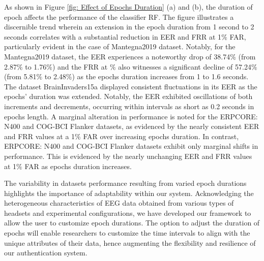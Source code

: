 As shown in Figure \ref{fig: Effect of Epochs Duration} (a) and (b), the duration of epoch affects the performance of the classifier RF. The figure  illustrates a discernible trend wherein an extension in the epoch duration from 1 second to 2 seconds correlates with a substantial reduction in EER and FRR at 1$\%$ FAR, particularly evident in the case of Mantegna2019 dataset. Notably, for the Mantegna2019 dataset, the EER experiences a noteworthy drop of 38.74$\%$ (from 2.87$\%$ to 1.76$\%$) and the FRR at $\%$ also witnesses a significant decline of 57.24$\%$ (from 5.81$\%$ to 2.48$\%$) as the epochs duration increases from 1 to 1.6 seconds. %
The dataset BrainInvaders15a displayed consistent fluctuations in its EER as the epochs' duration was extended. Notably, the EER exhibited oscillations of both increments and decrements, occurring within intervals as short as 0.2 seconds in epochs length.
A marginal alteration in performance is noted for the ERPCORE: N400 and COG-BCI Flanker datasets, as evidenced by the nearly consistent EER and FRR values at a 1$\%$ FAR over increasing epochs duration. 
In contrast, ERPCORE: N400 and COG-BCI Flanker datasets exhibit only marginal shifts in performance. This is evidenced by the nearly unchanging EER and FRR values at 1$\%$ FAR as epochs duration increases.
\smallskip

The variability in datasets performance resulting from varied epoch durations highlights the importance of adaptability within our system. Acknowledging the heterogeneous characteristics of EEG data obtained from various types of headsets and experimental configurations, we have developed our framework to allow the user to customize epoch durations. The option to adjust the duration of epochs will enable researchers to customize the time intervals to align with the unique attributes of their data, hence augmenting the flexibility and resilience of our authentication system.
     

